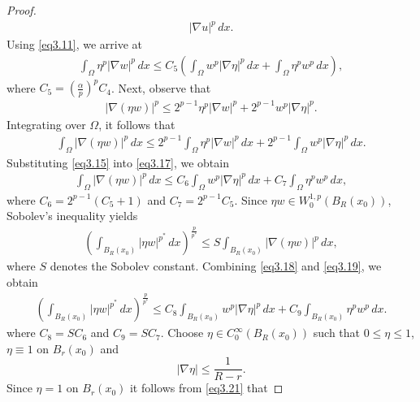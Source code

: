 \documentclass[12pt]{extarticle}
\theoremstyle{definition}
\theoremstyle{remark}
\theoremstyle{definition}
\numberwithin{equation}{section}
\numberwithin{equation}{section}
\begin{document}
\begin{proof}
\begin{align}
					|\nabla u|^p\,dx.
					\label{eq3.14}
				\end{align}				
				Using \eqref{eq3.11}, we arrive at
				\begin{align}
					\int_{\Omega}
					\eta^p
					|\nabla w|^p\,dx
					\le
					C_5
					\left(
					\int_{\Omega}
					w^p
					|\nabla\eta|^p\,dx
					+
					\int_{\Omega}
					\eta^pw^p\,dx
					\right),
					\label{eq3.15}
				\end{align}
				where $C_5=\left(\frac{\alpha}{p}\right)^pC_4$.	Next, observe that
				\begin{align}
					|\nabla(\eta w)|^p
					\le
					2^{p-1}
					\eta^p|\nabla w|^p
					+
					2^{p-1}
					w^p|\nabla\eta|^p.
					\label{eq3.16}
				\end{align}				
				Integrating over $\Omega$, it follows that
				\begin{align}
					\int_{\Omega}
					|\nabla(\eta w)|^p\,dx
					\le
					2^{p-1}
					\int_{\Omega}
					\eta^p|\nabla w|^p\,dx
					+
					2^{p-1}
					\int_{\Omega}
					w^p|\nabla\eta|^p\,dx.
					\label{eq3.17}
				\end{align}		
				Substituting \eqref{eq3.15} into \eqref{eq3.17}, we obtain
				\begin{align}
					\int_{\Omega}
					|\nabla(\eta w)|^p\,dx
					\le
					C_6
					\int_{\Omega}
					w^p|\nabla\eta|^p\,dx
					+
					C_7
					\int_{\Omega}
					\eta^pw^p\,dx,
					\label{eq3.18}
				\end{align}
				where $C_6=2^{p-1}(C_5+1)$ and $C_7=2^{p-1}C_5$. Since $\eta w\in W_0^{1,p}(B_R(x_0))$, Sobolev's inequality yields
				\begin{align}
					\left(
					\int_{B_R(x_0)}
					|\eta w|^{p^*}\,dx
					\right)^{\frac{p}{p^*}}
					\le
					S
					\int_{B_R(x_0)}
					|\nabla(\eta w)|^p\,dx,
					\label{eq3.19}
				\end{align}
				where \(S\) denotes the Sobolev constant. Combining \eqref{eq3.18} and \eqref{eq3.19}, we obtain
				\begin{align}
					\left(
					\int_{B_R(x_0)}
					|\eta w|^{p^*}\,dx
					\right)^{\frac{p}{p^*}}
					\le
					C_8
					\int_{B_R(x_0)}
					w^p|\nabla\eta|^p\,dx
					+
					C_9
					\int_{B_R(x_0)}
					\eta^pw^p\,dx.
					\label{eq3.21}
				\end{align}	
			where $C_8=SC_6$ and $C_9=SC_7$. Choose $\eta\in C_0^\infty(B_R(x_0))$ such that $0\le \eta\le1 $, $\eta\equiv1$ on $B_r(x_0)$ and
				\[
				|\nabla\eta|
				\le
				\frac{1}{R-r}.
				\]			
				Since $\eta=1$ on $B_r(x_0)$ it follows from \eqref{eq3.21} that

\end{proof}
\end{document}
